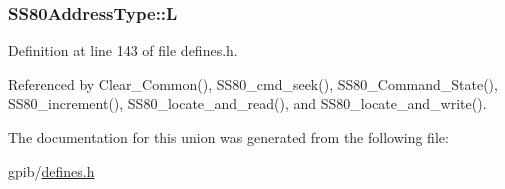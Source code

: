 \subsubsection[{\texorpdfstring{L}{L}}]{ S\+S80\+Address\+Type\+::L}\hypertarget{unionSS80AddressType_a4949ed9f8da550f9e09937db92750586}{}\label{unionSS80AddressType_a4949ed9f8da550f9e09937db92750586}


Definition at line 143 of file defines.\+h.



Referenced by Clear\+\_\+\+Common(), S\+S80\+\_\+cmd\+\_\+seek(), S\+S80\+\_\+\+Command\+\_\+\+State(), S\+S80\+\_\+increment(), S\+S80\+\_\+locate\+\_\+and\+\_\+read(), and S\+S80\+\_\+locate\+\_\+and\+\_\+write().



The documentation for this union was generated from the following file\+:\begin{DoxyCompactItemize}
\item 
gpib/\hyperlink{defines_8h}{defines.\+h}\end{DoxyCompactItemize}
